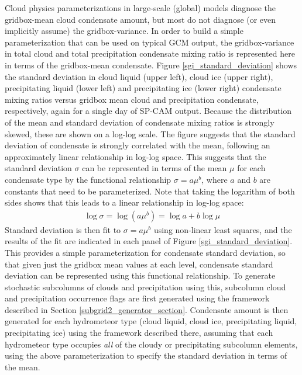 Cloud physics parameterizations in large-scale (global) models diagnose the gridbox-mean cloud condensate amount, but most do not diagnose (or even implicitly assume) the gridbox-variance. In order to build a simple parameterization that can be used on typical GCM output, the gridbox-variance in total cloud and total precipitation condensate mixing ratio is represented here in terms of the gridbox-mean condensate. Figure \ref{sgi_standard_deviation} shows the standard deviation in cloud liquid (upper left), cloud ice (upper right), precipitating liquid (lower left) and precipitating ice (lower right) condensate mixing ratios versus gridbox mean cloud and precipitation condensate, respectively, again for a single day of SP-CAM output. Because the distribution of the mean and standard deviation of condensate mixing ratios is strongly skewed, these are shown on a log-log scale. The figure suggests that the standard deviation of condensate is strongly correlated with the mean, following an approximately linear relationship in log-log space. This suggests that the standard deviation $\sigma$ can be represented in terms of the mean $\mu$ for each condensate type by the functional relationship $\sigma = a \mu^b$, where $a$ and $b$ are constants that need to be parameterized. Note that taking the logarithm of both sides shows that this leads to a linear relationship in log-log space:
\begin{gather}
    \log \sigma = \log(a \mu^b) = \log a + b\log \mu
\end{gather}
Standard deviation is then fit to $\sigma = a \mu^b$ using non-linear least squares, and the results of the fit are indicated in each panel of Figure \ref{sgi_standard_deviation}. This provides a simple parameterization for condensate standard deviation, so that given just the gridbox mean values at each level, condensate standard deviation can be represented using this functional relationship. To generate stochastic subcolumns of clouds and precipitation using this, subcolumn cloud and precipitation occurrence flags are first generated using the framework described in Section \ref{subgrid2_generator_section}. Condensate amount is then generated for each hydrometeor type (cloud liquid, cloud ice, precipitating liquid, precipitating ice) using the framework described there, assuming that each hydrometeor type occupies \emph{all} of the cloudy or precipitating subcolumn elements, using the above parameterization to specify the standard deviation in terms of the mean. %

